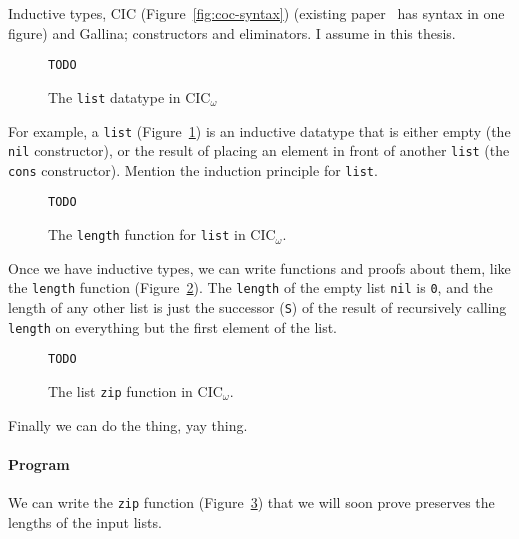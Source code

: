 Inductive types, CIC (Figure~\ref{fig:coc-syntax}) (existing paper~\cite{Timany2015FirstST} has syntax in one figure) and Gallina; constructors and eliminators. I assume  in this thesis.

\begin{figure}
\begin{lstlisting}
TODO
\end{lstlisting}
\caption{The \lstinline{list} datatype in CIC$_{\omega}$}
\label{fig:list-theory}
\end{figure}

For example, a \lstinline{list} (Figure~\ref{fig:list-theory}) is an inductive datatype that is 
either empty (the \lstinline{nil} constructor), or the result
of placing an element in front of another \lstinline{list} (the \lstinline{cons} constructor).
Mention the induction principle for \lstinline{list}.

\begin{figure}
\begin{lstlisting}
TODO
\end{lstlisting}
\caption{The \lstinline{length} function for \lstinline{list} in CIC$_{\omega}$.}
\label{fig:length-theory}
\end{figure}

Once we have inductive types, we can write functions and proofs about them, like the \lstinline{length} function (Figure~\ref{fig:length-theory}).
The \lstinline{length} of the empty list \lstinline{nil} is \lstinline{0}, and the length of any other list
is just the successor (\lstinline{S}) of the result of recursively calling \lstinline{length} on everything but the first element of the list.

\begin{figure}
\begin{lstlisting}
TODO
\end{lstlisting}
\caption{The list \lstinline{zip} function in CIC${_\omega}$.}
\label{fig:zip-theory}
\end{figure}

Finally we can do the thing, yay thing.

\paragraph{Program}
We can write the \lstinline{zip} function (Figure~\ref{fig:zip-theory}) that we will soon prove preserves the lengths of the input lists.

